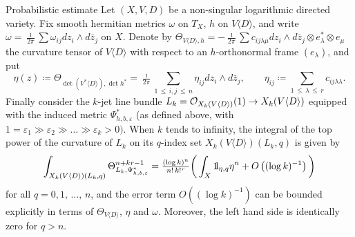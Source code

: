 \documentclass[AHL,Unicode,longabstracts,published]{cedram}
\newcommand*\cO{\mathcal{O}}
\newcommand*\bOne{{\mathchoice {\rm 1\mskip-4mu l} {\rm 1\mskip-4mu l} {\rm 1\mskip-4.5mu l}{\rm 1\mskip-5mu l}}}
\let\leq\leqslant
\newcommand*\bydef{\coloneqq}
\begin{document}
\begin{enonce}
{Probabilistic estimate}\label{pe}
Let $(X,V,D)$ be a non-singular logarithmic directed variety. Fix smooth hermitian metrics $\omega$ on $T_X$, $h$ on $V\langle D\rangle$, and write
$\omega=\tfrac{\imath}{ 2\pi} \sum\omega_{ij}dz_i\wedge d\bar z_j$ on $X$. Denote by $\Theta_{V\langle D\rangle,h}=-\tfrac{\imath}{ 2\pi}\sum c_{ij\lambda\mu}dz_i\wedge d\bar z_j\otimes e_\lambda^*\otimes e_\mu$ the curvature tensor of $V\langle D\rangle$ with respect to an $h$-orthonormal frame $(e_\lambda)$, and put
\[
\eta(z)
\bydef
\Theta_{\det(V^*\langle D\rangle),\det h^*}=
\tfrac{\imath}{ 2\pi}\sum_{1\,\leq\,i,j\,\leq\,n}\eta_{ij} dz_i\wedge d\bar z_j,\qquad
\eta_{ij}
\bydef
\sum_{1\,\leq\,\lambda\,\leq\,r}c_{ij\lambda\lambda}.
\]
Finally consider the $k$-jet line bundle
$L_k=\smash{\cO_{X_k(V\langle D\rangle)}(1)}\to X_k(V\langle D\rangle)$ equipped with the induced metric
$\Psi^*_{h,b,\varepsilon}$ (as defined above, with
$1=\varepsilon_1\gg\varepsilon_2\gg\ldots\gg \varepsilon_k>0)$. When $k$ tends to infinity, the integral of the top power of the curvature of
$L_k$ on its $q$-index set $X_k(V\langle D\rangle)(L_k,q)$ is given by
\[
\int_{X_k(V\langle D\rangle)(L_k,q)}
\Theta_{L_k,\Psi^*_{h,b,\varepsilon}}^{n+kr-1}=
\tfrac{(\log k)^n}{ n!\,k!^r}\bigg(
\int_X\bOne_{\eta,q}\eta^n+O\left((\log k)^{-1}\right)\bigg)
\]
for all $q=0,1,\,\dotsc,\,n$, and the error term $O((\log k)^{-1})$ can be bounded explicitly in terms of $\Theta_{V\langle D\rangle}$, $\eta$ and
$\omega$. Moreover, the left hand side is identically zero for $q>n$.
\end{enonce}
\end{document}
